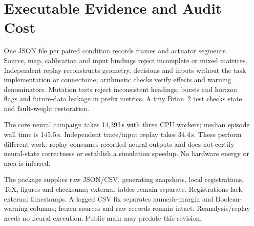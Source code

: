 \section{Executable Evidence and Audit Cost}
One JSON file per paired condition records frames and actuator segments. Source, map, calibration and input bindings reject incomplete or mixed matrices. Independent replay reconstructs geometry, decisions and inputs without the task implementation or connectome; arithmetic checks verify effects and warning denominators. Mutation tests reject inconsistent headings, bursts and horizon flags and future-data leakage in prefix metrics. A tiny Brian~2 test checks state and fault-weight restoration.

The core neural campaign takes 14,393\,s with three CPU workers; median episode wall time is 145.5\,s. Independent trace/input replay takes 34.4\,s. These perform different work: replay consumes recorded neural outputs and does not certify neural-state correctness or establish a simulation speedup. No hardware energy or area is inferred.

The package supplies raw JSON/CSV, generating snapshots, local registrations, TeX, figures and checksums; external tables remain separate. Registrations lack external timestamps. A logged CSV fix separates numeric-margin and Boolean-warning columns; frozen sources and raw records remain intact. Reanalysis/replay needs no neural execution. Public main may predate this revision.

